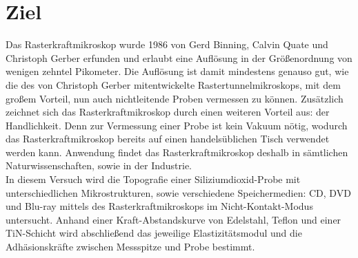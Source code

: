\section{Ziel}
\label{sec:Ziel}

Das Rasterkraftmikroskop wurde 1986 von Gerd Binning, Calvin Quate und Christoph
Gerber \cite{entw} erfunden und erlaubt eine Auflösung in der Größenordnung von
wenigen zehntel Pikometer. Die Auflösung ist damit mindestens genauso gut, wie die
des von Christoph Gerber mitentwickelte Rastertunnelmikroskops, mit dem großem
Vorteil, nun auch nichtleitende Proben vermessen zu können. Zusätzlich zeichnet
sich das Rasterkraftmikroskop durch einen weiteren Vorteil aus: der Handlichkeit.
Denn zur Vermessung einer Probe ist kein Vakuum nötig, wodurch das Rasterkraftmikroskop
bereits auf einen handelsüblichen Tisch verwendet werden kann. Anwendung findet das
Rasterkraftmikroskop deshalb in sämtlichen Naturwissenschaften, sowie in der
Industrie.\\
In diesem Versuch wird die Topografie einer Siliziumdioxid-Probe mit unterschiedlichen
Mikrostrukturen, sowie verschiedene Speichermedien: CD, DVD und Blu-ray mittels
des Rasterkraftmikroskops im Nicht-Kontakt-Modus untersucht. Anhand einer
Kraft-Abstandskurve von Edelstahl, Teflon und einer TiN-Schicht wird abschließend
das jeweilige Elastizitätsmodul und die Adhäsionskräfte zwischen Messspitze und
Probe bestimmt.
